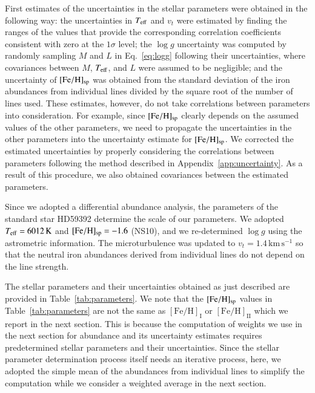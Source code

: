 \documentclass{aa}
\begin{document}
First estimates of the uncertainties in the stellar parameters were obtained in the following way:
the uncertainties in $T_{\rm eff}$ and $v_t$ were estimated by finding the ranges of the values that provide the corresponding correlation coefficients consistent with zero at the $1\sigma$ level;
the $\log g$ uncertainty was computed by randomly sampling $M$ and $L$ in Eq.~\ref{eq:logg} following their uncertainties, where covariances between $M$, $T_{\rm eff}$, and $L$ were assumed to be negligible;
and the uncertainty of $[\mathrm{Fe/H}]_{\rm sp}$ was obtained from the standard deviation of the iron abundances from individual lines divided by the square root of the number of lines used.
These estimates, however, do not take correlations between parameters into consideration.
For example, since $[\mathrm{Fe/H}]_{\rm sp}$ clearly depends on the assumed values of the other parameters, we need to propagate the uncertainties in the other parameters into the uncertainty estimate for $[\mathrm{Fe/H}]_{\rm sp}$.
We corrected the estimated uncertainties by properly considering the correlations between parameters following the method described in Appendix~\ref{app:uncertainty}.
As a result of this procedure, we also obtained covariances between the estimated parameters.

Since we adopted a differential abundance analysis, the parameters of the standard star HD59392 determine the scale of our parameters.
We adopted $T_{\rm eff}=6012\,\mathrm{K}$ and $[\mathrm{Fe/H}]_{\rm sp}=-1.6$ (NS10), and we re-determined $\log g$ using the astrometric information.
The microturbulence was updated to $v_t=1.4\,\mathrm{km\,s^{-1}}$ so that the neutral iron abundances derived from individual lines do not depend on the line strength.

The stellar parameters and their uncertainties obtained as just described are provided in Table~\ref{tab:parameters}.
We note that the $[\mathrm{Fe/H}]_{\rm sp}$ values in Table~\ref{tab:parameters} are not the same as $[\mathrm{Fe/H}]_{\mathrm{I}}$ or $[\mathrm{Fe/H}]_{\mathrm{II}}$ which we report in the next section. 
This is because the computation of weights we use in the next section for abundance and its uncertainty estimates requires predetermined stellar parameters and their uncertainties.
Since the stellar parameter determination process itself needs an iterative process, here, we adopted the simple mean of the abundances from individual lines to simplify the computation while we consider a weighted average in the next section.
\end{document}
